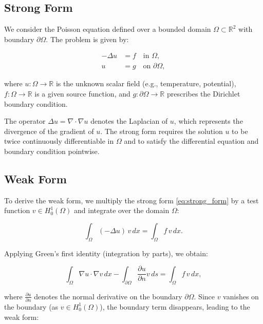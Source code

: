 \documentclass[12pt]{article}
\begin{document}
\subsection{Strong Form}

We consider the Poisson equation defined over a bounded domain $\Omega \subset \mathbb{R}^2$ with boundary $\partial \Omega$. The problem is given by:

\begin{equation}
\begin{aligned}
    -\Delta u &= f \quad \text{in } \Omega, \\
    u &= g \quad \text{on } \partial \Omega,
\end{aligned}
\label{eq:strong_form}
\end{equation}

where $u: \Omega \rightarrow \mathbb{R}$ is the unknown scalar field (e.g., temperature, potential), $f: \Omega \rightarrow \mathbb{R}$ is a given source function, and $g: \partial \Omega \rightarrow \mathbb{R}$ prescribes the Dirichlet boundary condition.

The operator $\Delta u = \nabla \cdot \nabla u$ denotes the Laplacian of $u$, which represents the divergence of the gradient of $u$. The strong form requires the solution $u$ to be twice continuously differentiable in $\Omega$ and to satisfy the differential equation and boundary condition pointwise.


\subsection{Weak Form}

To derive the weak form, we multiply the strong form \eqref{eq:strong_form} by a test function $v \in H^1_0(\Omega)$ and integrate over the domain $\Omega$:

\begin{equation}
\int_{\Omega} (-\Delta u)\, v \, dx = \int_{\Omega} f\, v \, dx.
\end{equation}

Applying Green's first identity (integration by parts), we obtain:

\begin{equation}
\int_{\Omega} \nabla u \cdot \nabla v \, dx - \int_{\partial\Omega} \frac{\partial u}{\partial n} v \, ds = \int_{\Omega} f\, v \, dx,
\end{equation}

where $\frac{\partial u}{\partial n}$ denotes the normal derivative on the boundary $\partial\Omega$. Since $v$ vanishes on the boundary (as $v \in H^1_0(\Omega)$), the boundary term disappears, leading to the weak form:
\end{document}

